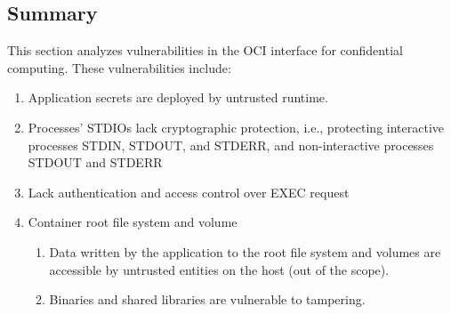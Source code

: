 \subsection{Summary}
\label{sec:security_analyse_oci_summary}
This section analyzes vulnerabilities in the OCI interface for confidential computing. These vulnerabilities include:
 \begin{enumerate}
  \item\label{vulnerability:1} Application secrets are deployed by untrusted runtime.
  \item\label{vulnerabilities:2} Processes' STDIOs lack cryptographic protection, i.e., protecting interactive processes STDIN, STDOUT, and STDERR, and non-interactive processes STDOUT and STDERR
  \item\label{vulnerabilities:4}Lack authentication and access control over EXEC request
  \item Container root file system and volume
      \begin{enumerate}
        \item\label{vulnerabilities:5} Data written by the application to the root file system and volumes are accessible by untrusted entities on the host (out of the scope).
        \item\label{vulnerabilities:6} Binaries and shared libraries are vulnerable to tampering.
      \end{enumerate}

\end{enumerate}
